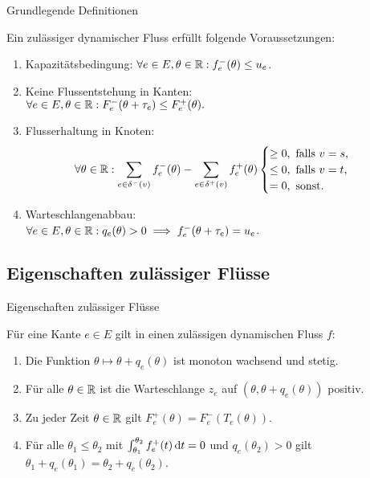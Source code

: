 \begin{frame}{Grundlegende Definitionen}
	\begin{definition}
		Ein zulässiger dynamischer Fluss erfüllt folgende Voraussetzungen:
		\begin{enumerate}[label=(F\arabic*)]
			\item\label{def-feasible-flow-capacity} Kapazitätsbedingung: $\forall e\in E, \theta\in\mathbb{R}: f_e^-(\theta)\leq u_e$.
			\item\label{def-feasible-flow-no-negative-flow} Keine Flussentstehung in Kanten:\\ $\forall e\in E, \theta\in\mathbb{R}: F_e^-(\theta + \tau_e) \leq F_e^+(\theta).$
			\item\label{def-feasible-flow-no-flow-at-node} Flusserhaltung in Knoten:
			\[
			\forall\theta\in\mathbb{R}: \sum_{e\in\delta^-(v)}f^-_e(\theta) - \sum_{e\in\delta^+(v)} f_e^+(\theta) \begin{cases}
				\geq 0, \text{ falls $v=s$,}\\
				\leq 0, \text{ falls $v=t$,}\\
				= 0, \text{ sonst.}
			\end{cases}\]
			\item\label{def-feasible-flow-queue-with-capacity} Warteschlangenabbau:\\
			$\forall e\in E, \theta\in\mathbb{R}: q_e(\theta) > 0 \implies f_e^-(\theta + \tau_e) = u_e$.
		\end{enumerate}
	\end{definition}
\end{frame}

\subsection{Eigenschaften zulässiger Flüsse}
\begin{frame}{Eigenschaften zulässiger Flüsse}
	\begin{proposition}\label{prop-feasible-flow}
		Für eine Kante $e\in E$ gilt in einen zulässigen dynamischen Fluss $f$:
		\begin{enumerate}[label=(\roman*)]
			\item\label{prop-feasible-flow-T-mon-inc-cont} Die Funktion $\theta \mapsto \theta + q_e(\theta)$ ist monoton wachsend und stetig.
			\item\label{prop-feasible-flow-positive-queue} Für alle $\theta\in\mathbb{R}$ ist die Warteschlange $z_e$ auf $(\theta, \theta + q_e(\theta))$ positiv.
			\item\label{prop-feasible-flow-det-outflow} Zu jeder Zeit $\theta\in\mathbb{R}$ gilt $F_e^+(\theta) = F_e^-(T_e(\theta))$.
			\item\label{prop-feasible-flow-queue-delay} Für alle $\theta_1 \leq \theta_2$ mit $\int_{\theta_1}^{\theta_2} f^+_e(t) \mathop{}\!\mathrm{d} t = 0$ und $q_e(\theta_2)>0$ gilt $\theta_1 + q_e(\theta_1) = \theta_2 + q_e(\theta_2)$.
		\end{enumerate}
	\end{proposition}
\end{frame}

